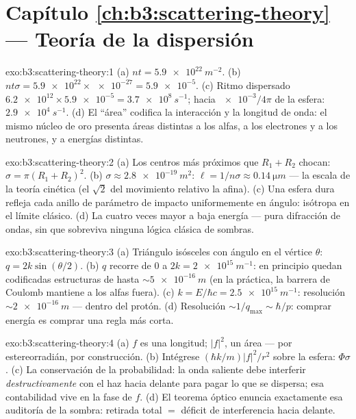 \section*{Capítulo \ref{ch:b3:scattering-theory} --- Teoría de la dispersión}

\begin{solution}{exo:b3:scattering-theory:1}
(a) $nt = \qty{5.9e22}{m^{-2}}$. (b) $nt\sigma = \num{5.9e22}
\times \num{e-27} = \num{5.9e-5}$. (c) Ritmo dispersado
$\num{6.2e12} \times \num{5.9e-5} = \qty{3.7e8}{s^{-1}}$; hacia
$\num{e-3}/4\pi$ de la esfera: $\qty{2.9e4}{s^{-1}}$. (d) El
``área'' codifica la interacción y la longitud de onda: el mismo núcleo de
oro presenta áreas distintas a los alfas, a los electrones y a los
neutrones, y a energías distintas.
\end{solution}

\begin{solution}{exo:b3:scattering-theory:2}
(a) Los centros más próximos que $R_1 + R_2$ chocan: $\sigma = \pi(R_1 +
R_2)^2$. (b) $\sigma \approx \qty{2.8e-19}{m^2}$: $\ell = 1/n\sigma
\approx \qty{0.14}{\micro m}$ --- la escala de la teoría cinética (el
$\sqrt2$ del movimiento relativo la afina). (c) Una esfera dura
refleja cada anillo de parámetro de impacto uniformemente en ángulo:
isótropa en el límite clásico. (d) La  cuatro veces mayor a
baja energía --- pura difracción de ondas, sin que sobreviva ninguna lógica
clásica de sombras.
\end{solution}

\begin{solution}{exo:b3:scattering-theory:3}
(a) Triángulo isósceles con ángulo en el vértice $\theta$: $q =
2k\sin(\theta/2)$. (b) $q$ recorre de $0$ a $2k = \qty{2e15}{
m^{-1}}$: en principio quedan codificadas estructuras de hasta
$\sim\qty{5e-16}{m}$ (en la práctica, la barrera de Coulomb mantiene a los
alfas fuera). (c) $k = E/\hbar c = \qty{2.5e15}{m^{-1}}$: resolución
$\sim\qty{2e-16}{m}$ --- dentro del protón. (d) Resolución
$\sim 1/q_{\max} \sim \hbar/p$: comprar energía es comprar una regla más
corta.
\end{solution}

\begin{solution}{exo:b3:scattering-theory:4}
(a) $f$ es una longitud; $|f|^2$, un área --- por estereorradián, por
construcción. (b) Intégrese $(\hbar k/m)|f|^2/r^2$ sobre la
esfera: $\Phi\sigma$. (c) La conservación de la probabilidad: la onda
saliente debe interferir \emph{destructivamente} con el haz hacia delante
para pagar lo que se dispersa; esa contabilidad vive en la fase de $f$. (d)
El teorema óptico enuncia exactamente esa auditoría de la sombra: retirada
total $=$ déficit de interferencia hacia delante.
\end{solution}


